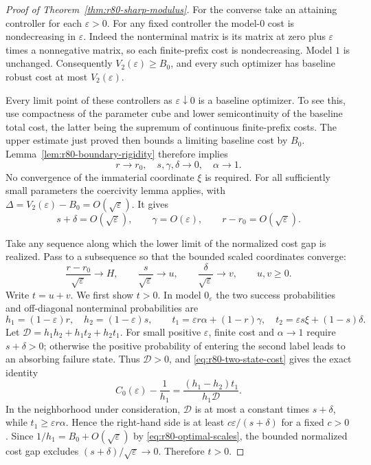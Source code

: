 \begin{proof}[Proof of Theorem~\ref{thm:r80-sharp-modulus}]
For the converse take an attaining controller for each
$\varepsilon>0$.  For any fixed controller the model-$0$
cost is nondecreasing in $\varepsilon$.  Indeed the
nonterminal matrix is its matrix at zero plus
$\varepsilon$ times a nonnegative matrix, so each finite-prefix
cost is nondecreasing.  Model $1$ is unchanged.  Consequently
$V_2(\varepsilon)\ge B_0$, and every such optimizer has baseline
robust cost at most $V_2(\varepsilon)$.

Every limit point of these controllers as
$\varepsilon\downarrow0$ is a baseline optimizer.  To see this,
use compactness of the parameter cube and lower semicontinuity
of the baseline total cost, the latter being the supremum of
continuous finite-prefix costs.  The upper estimate just proved
then bounds a limiting baseline cost by $B_0$.
Lemma~\ref{lem:r80-boundary-rigidity} therefore implies
\[
 r\longrightarrow r_0,\quad s,\gamma,\delta\longrightarrow0,
                 \quad\alpha\longrightarrow1.
\]
No convergence of the immaterial coordinate $\xi$ is required.
For all sufficiently small parameters the coercivity lemma applies,
with $\Delta=V_2(\varepsilon)-B_0=O(\sqrt\varepsilon)$.
It gives
\begin{equation}\label{eq:r80-optimal-scales}
 s+\delta=O(\sqrt\varepsilon),\qquad
 \gamma=O(\varepsilon),\qquad
 r-r_0=O(\sqrt\varepsilon).
\end{equation}

Take any sequence along which the lower limit of the normalized
cost gap is realized.  Pass to a subsequence so that the bounded
scaled coordinates converge:
\[
 \frac{r-r_0}{\sqrt\varepsilon}\longrightarrow H,
 \qquad\frac{s}{\sqrt\varepsilon}\longrightarrow u,
 \qquad\frac{\delta}{\sqrt\varepsilon}\longrightarrow v,
 \qquad u,v\ge0.
\]
Write $t=u+v$.  We first show $t>0$.
In model $0_\varepsilon$ the two success probabilities and
off-diagonal nonterminal probabilities are
\begin{equation}\label{eq:r80-perturbed-chain}
 h_1=(1-\varepsilon)r,\quad h_2=(1-\varepsilon)s,
 \qquad
 t_1=\varepsilon r\alpha+(1-r)\gamma,\quad
 t_2=\varepsilon s\xi+(1-s)\delta.
\end{equation}
Let $\mathcal D=h_1h_2+h_1t_2+h_2t_1$.
For small positive $\varepsilon$, finite cost and
$\alpha\longrightarrow1$ require $s+\delta>0$;
otherwise the positive probability of entering the second label
leads to an absorbing failure state.  Thus $\mathcal D>0$, and
\eqref{eq:r80-two-state-cost} gives the exact identity
\begin{equation}\label{eq:r80-trap-cost}
 C_0(\varepsilon)-\frac1{h_1}
       =\frac{(h_1-h_2)t_1}{h_1\mathcal D}.
\end{equation}
In the neighborhood under consideration, $\mathcal D$ is at most
a constant times $s+\delta$, while $t_1\ge\varepsilon r\alpha$.
Hence the right-hand side is at least
$c\varepsilon/(s+\delta)$ for a fixed $c>0$.
Since $1/h_1=B_0+O(\sqrt\varepsilon)$ by
\eqref{eq:r80-optimal-scales}, the bounded normalized cost gap
excludes $(s+\delta)/\sqrt\varepsilon\longrightarrow0$.
Therefore $t>0$.


\end{proof}
